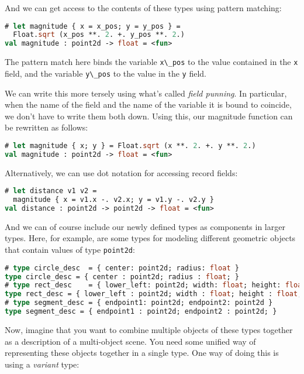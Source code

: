 And we can get access to the contents of these types using pattern
matching:

\begin{lstlisting}[language=Caml]
# let magnitude { x = x_pos; y = y_pos } =
  Float.sqrt (x_pos **. 2. +. y_pos **. 2.)
val magnitude : point2d -> float = <fun>
\end{lstlisting}

The pattern match here binds the variable
\passthrough{\lstinline!x\_pos!} to the value contained in the
\passthrough{\lstinline!x!} field, and the variable
\passthrough{\lstinline!y\_pos!} to the value in the
\passthrough{\lstinline!y!} field.

We can write this more tersely using what's called \emph{field punning}.
In particular, when the name of the field and the name of the variable
it is bound to coincide, we don't have to write them both down. Using
this, our magnitude function can be rewritten as
follows:

\begin{lstlisting}[language=Caml]
# let magnitude { x; y } = Float.sqrt (x **. 2. +. y **. 2.)
val magnitude : point2d -> float = <fun>
\end{lstlisting}

Alternatively, we can use dot notation for accessing record fields:

\begin{lstlisting}[language=Caml]
# let distance v1 v2 =
  magnitude { x = v1.x -. v2.x; y = v1.y -. v2.y }
val distance : point2d -> point2d -> float = <fun>
\end{lstlisting}

And we can of course include our newly defined types as components in
larger types. Here, for example, are some types for modeling different
geometric objects that contain values of type
\passthrough{\lstinline!point2d!}:

\begin{lstlisting}[language=Caml]
# type circle_desc  = { center: point2d; radius: float }
type circle_desc = { center : point2d; radius : float; }
# type rect_desc    = { lower_left: point2d; width: float; height: float }
type rect_desc = { lower_left : point2d; width : float; height : float; }
# type segment_desc = { endpoint1: point2d; endpoint2: point2d }
type segment_desc = { endpoint1 : point2d; endpoint2 : point2d; }
\end{lstlisting}

Now, imagine that you want to combine multiple objects of these types
together as a description of a multi-object scene. You need some unified
way of representing these objects together in a single type. One way of
doing this is using a \emph{variant}
type:

